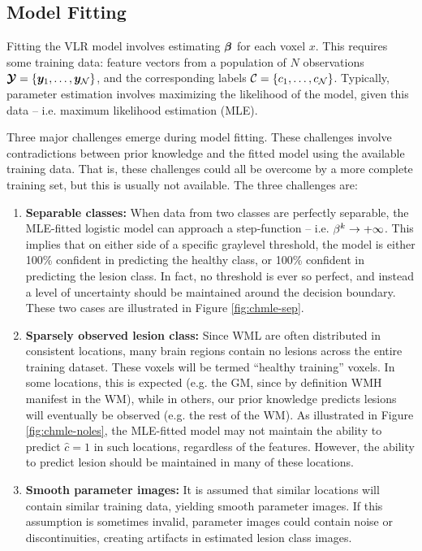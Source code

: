\subsection{Model Fitting}\label{ss:modelfitting}
Fitting the VLR model involves estimating $\bm{\beta}$ for each voxel $x$. This requires some training data: feature vectors from a population of $N$ observations $\bm{\mathcal{Y}} = \{\bm{y}_1,\dots,\bm{y}_{\mathcal{N}}\}$, and the corresponding labels $\mathcal{C} = \{c_1,\dots,c_{\mathcal{N}}\}$. Typically, parameter estimation involves maximizing the likelihood of the model, given this data -- i.e. maximum likelihood estimation (MLE).
\par
Three major challenges emerge during model fitting. These challenges involve contradictions between prior knowledge and the fitted model using the available training data. That is, these challenges could all be overcome by a more complete training set, but this is usually not available. The three challenges are:
\begin{enumerate}
  \item \label{chmle:separable} \textbf{Separable classes:} 
  When data from two classes are perfectly separable, the MLE-fitted logistic model can approach a step-function -- i.e. $\beta^k\rightarrow+\infty$. This implies that on either side of a specific graylevel threshold, the model is either 100\% confident in predicting the healthy class, or 100\% confident in predicting the lesion class. In fact, no threshold is ever so perfect, and instead a level of uncertainty should be maintained around the decision boundary. These two cases are illustrated in Figure \ref{fig:chmle-sep}.
  \item \label{chmle:sparse} \textbf{Sparsely observed lesion class:} 
  Since WML are often distributed in consistent locations, many brain regions contain no lesions across the entire training dataset. These voxels will be termed ``healthy training'' voxels. In some locations, this is expected (e.g. the GM, since by definition WMH manifest in the WM), while in others, our prior knowledge predicts lesions will eventually be observed (e.g. the rest of the WM). As illustrated in Figure \ref{fig:chmle-noles}, the MLE-fitted model may not maintain the ability to predict $\hat{c} = 1$ in such locations, regardless of the features. However, the ability to predict lesion should be maintained in many of these locations.
  \item \label{chmle:noisy} \textbf{Smooth parameter images:} 
  It is assumed that similar locations will contain similar training data, yielding smooth parameter images. If this assumption is sometimes invalid, parameter images could contain noise or discontinuities, creating artifacts in estimated lesion class images.
\end{enumerate}
